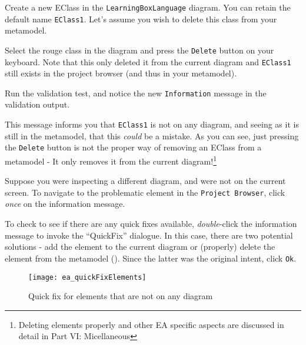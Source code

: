 \begin{stepbystep}
\item Create a new EClass in the \texttt{Learning\-Box\-Language} diagram. You can retain the default name \texttt{EClass1}. Let's
assume you wish to delete this class from your metamodel.

\item Select the rouge class in the diagram and press the \texttt{Delete} button on your keyboard. Note that this only deleted it from
the current diagram and \texttt{EClass1} still exists in the project browser (and thus in your metamodel).

\item Run the validation test, and notice the new \texttt{Information} message in the validation output.
%

This message informs you that \texttt{EClass1} is not on any diagram, and seeing as it is still in the metamodel, that this \emph{could} be a mistake. As you
can see, just pressing the \texttt{Delete} button is not the proper way of removing an EClass from a metamodel - It only removes it from the current
diagram!\footnote{Deleting elements properly and other EA specific aspects are discussed in detail in Part VI: Micellaneous}

\item Suppose you were inspecting a different diagram, and were not on the current screen. To navigate to the problematic element in the
\texttt{Project Browser}, click \emph{once} on the information message.

\item To check to see if there are any quick fixes available, \emph{double}-click the information message to invoke the ``QuickFix''
dialogue. In this case, there are two potential solutions - add the element to the current diagram or (properly) delete the element from the metamodel
(). Since the latter was the original intent, click \texttt{Ok}.

\vspace{0.5cm}

\begin{figure}[htbp]
	\centering
  \texttt{[image: ea\_quickFixElements]}
	\caption{Quick fix for elements that are not on any diagram}
	\label{ea:quick-fix1}
\end{figure}
\FloatBarrier


\end{stepbystep}
